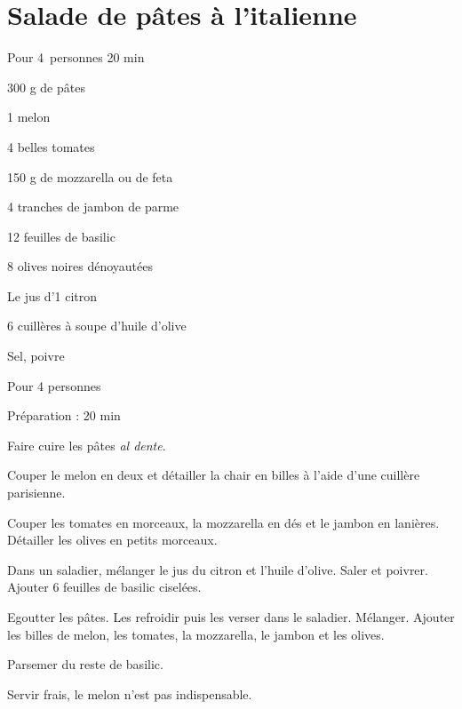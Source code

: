 \clearpage
\section{Salade de pâtes à l'italienne}		%

{\flushright Pour 4 personnes
20 min}

\begin{ingredients}
\item 300 g de p\^ates
\item 1 melon
\item 4 belles tomates
\item 150 g de mozzarella ou de feta
\item 4 tranches de jambon de parme
\item 12 feuilles de basilic
\item 8 olives noires d\'enoyaut\'ees
\item Le jus d'1 citron
\item 6 cuill\`eres \`a soupe d'huile d'olive
\item Sel, poivre
\end{ingredients}
\begin{infos}
\item Pour 4 personnes
\item Préparation : 20 min
\end{infos}
\begin{etapes}
\item Faire cuire les p\^ates \textit{al dente}.
\item Couper le melon en deux et d\'etailler la chair en billes \`a l'aide d'une cuill\`ere parisienne.
\item Couper les tomates en morceaux, la mozzarella en d\'es et le jambon en lani\`eres. D\'etailler les olives en petits morceaux.
\item Dans un saladier, m\'elanger le jus du citron et l'huile d'olive. Saler et poivrer. Ajouter 6 feuilles de basilic cisel\'ees.
\item Egoutter les p\^ates. Les refroidir puis les verser dans le saladier. M\'elanger. Ajouter les billes de melon, les tomates, la mozzarella, le jambon et les olives.
\item Parsemer du reste de basilic.
\end{etapes}
\begin{conseils}
Servir frais, le melon n'est pas indispensable.
\end{conseils}

